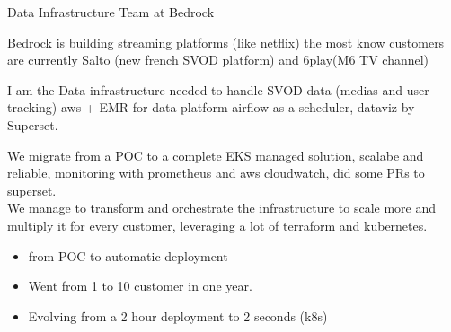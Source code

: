 \documentclass[10pt,a4paper,ragged2e,withhyper]{altacv}
\begin{document}
\begin{paracol}{2}



\parskip=12pt %

Data Infrastructure Team at Bedrock


Bedrock is building streaming platforms (like netflix) the most know customers are currently Salto (new french SVOD platform) and 6play(M6 TV channel)


I am the Data infrastructure needed to handle SVOD data (medias and user tracking)
aws +  EMR for data platform airflow as a scheduler, dataviz by Superset.


We migrate from a POC to a complete EKS managed solution, scalabe and reliable, monitoring  with prometheus and aws cloudwatch, did some PRs to superset.\\

We manage to transform and orchestrate the infrastructure to scale more and multiply it for every customer, leveraging a lot of terraform and kubernetes.\\
\begin{itemize}
\item from POC to automatic deployment
\item Went from 1 to 10 customer in one year.
\item Evolving from a 2 hour deployment to 2 seconds (k8s)
\end{itemize}

\parskip=0pt %


\hspace*{-2.5em}  %




\end{paracol}
\end{document}
